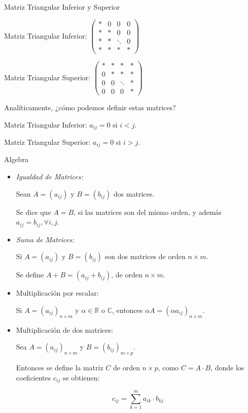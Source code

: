 {Matriz Triangular Inferior y Superior}

Matriz Triangular Inferior: $ \left(
\begin{array}{cccc}
    *       &     0     &      0      &   0    \\
    *       &     *     &     0      &    0      \\
    *      &      *    & \ddots  &     0      \\
    *      &      *    &       *        & *
\end{array}
\right)$


Matriz Triangular Superior: $   \left(
\begin{array}{cccc}
*           &    *        &      *      &     *    \\
    0       & *           &      *      &    *      \\
    0      &       0     & \ddots  &       *      \\
    0      &        0    &       0        & *
\end{array}
\right)$

Analíticamente, ¿cómo podemos definir estas matrices?


Matriz Triangular Inferior: $a_{ij}=0$ si $i<j$.


Matriz Triangular Superior: $a_{ij}=0$ si $i>j$.


{Algebra}

\begin{itemize}
\item
\textit{Igualdad de Matrices:}

Sean $A=(a_{ij})$ y $B=(b_{ij})$ dos matrices.

Se dice que $A=B$, si las matrices son del mismo orden, y además $a_{ij} = b_{ij}, \forall i,j $.

\item
\textit{Suma de Matrices:}

Si $A=(a_{ij})$ y $B=(b_{ij}) $ son dos matrices de orden $n\times m$.

Se define $A + B =(a_{ij} + b_{ij}) $, de orden  $n\times m$.

\item
Multiplicación por escalar:

Si $A=(a_{ij})_{n\times m}$ y $\alpha \in \mathbb{R}$ o  $\mathbb{C}$, entonces $\alpha A= (\alpha a_{ij})_{n\times m}$.

\item
Multiplicación de dos matrices:

Sea $A=(a_{ij})_{n\times m}$ y $B=(b_{ij})_{m \times p}$. 

Entonces se define la matriz $C$ de orden $n\times p$, como $C= A \cdot B$, donde los coeficientes $c_{ij}$ se obtienen:

$$c_{ij}= \sum_{k=1}^{m}a_{ik}\cdot b_{kj}$$

\end{itemize}


